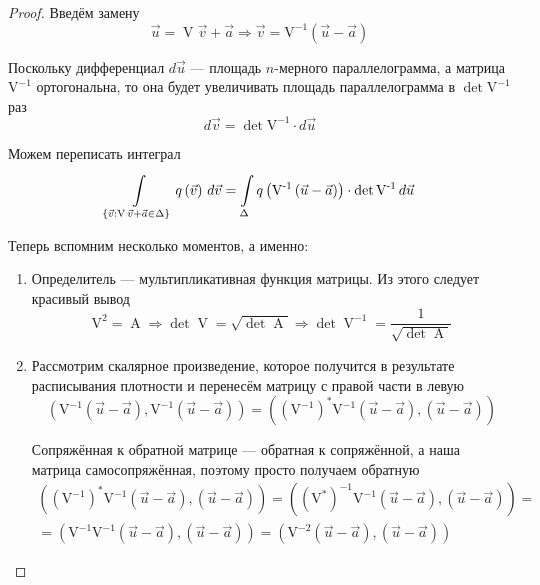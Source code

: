 \begin{proof}
    Введём замену
    $$\vec{u} = \operatorname{V} \vec{v} + \vec{a}
        \Rightarrow
        \vec{v} = \operatorname{V^{-1}} \left( \vec{u} - \vec{a} \right)$$

    Поскольку дифференциал $d\vec{u}$ --- площадь $n$-мерного параллелограмма,
    а матрица $\operatorname{V^{-1}}$ ортогональна, то она будет увеличивать
    площадь параллелограмма в $\det{\operatorname{V^{-1}}}$ раз
    $$d\vec{v} = \det{\operatorname{V^{-1}}} \cdot d\vec{u}$$

    Можем переписать интеграл
    \begin{equation}\label{eq:gaussDencityIntegral}
    \integrall{\left\{ \vec{v}: \operatorname{V} \vec{v} + \vec{a}
            \in \Delta \right\}}{d\vec{v}}{q\left( \vec{v} \right)}
        = \integrall{\Delta}{d\vec{u}}{ q\left( \operatorname{V^{-1}}
                \left( \vec{u} - \vec{a} \right) \right)
            \cdot \det{\operatorname{V^{-1}}}}
    \end{equation}

    Теперь вспомним несколько моментов, а именно:
    \begin{enumerate}
        \item Определитель --- мультипликативная функция матрицы. Из этого
            следует красивый вывод
            $$\operatorname{V^2} = \operatorname{A}
                \Rightarrow \det{\operatorname{V}}
                    = \sqrt{\det{\operatorname{A}}}
                \Rightarrow \det{\operatorname{V}^{-1}}
                    = \frac{1}{\sqrt{\det{\operatorname{A}}}}$$
        \item Рассмотрим скалярное произведение, которое получится в результате
            расписывания плотности и перенесём матрицу с правой части в левую
            $$\left( \operatorname{V^{-1}} \left( \vec{u} - \vec{a} \right),
                    \operatorname{V^{-1}} \left( \vec{u} - \vec{a} \right)
                    \right)
                = \left( \left( \operatorname{V^{-1}} \right)^*
                        \operatorname{V^{-1}} \left( \vec{u} - \vec{a} \right),
                        \left( \vec{u} - \vec{a} \right) \right)$$

            Сопряжённая к обратной матрице --- обратная к сопряжённой, а
            наша матрица самосопряжённая, поэтому просто получаем обратную
            \begin{align*}
                \left( \left( \operatorname{V^{-1}} \right)^*
                        \operatorname{V^{-1}} \left( \vec{u} - \vec{a} \right),
                        \left( \vec{u} - \vec{a} \right) \right)
                = \left( \left( \operatorname{V^*} \right)^{-1}
                        \operatorname{V^{-1}} \left( \vec{u} - \vec{a} \right),
                        \left( \vec{u} - \vec{a} \right) \right) = \\
                = \left( \operatorname{V^{-1}}
                        \operatorname{V^{-1}} \left( \vec{u} - \vec{a} \right),
                        \left( \vec{u} - \vec{a} \right) \right)
                = \left( \operatorname{V^{-2}} \left( \vec{u} - \vec{a} \right),
                        \left( \vec{u} - \vec{a} \right) \right)
            \end{align*}


\end{enumerate}
\end{proof}
